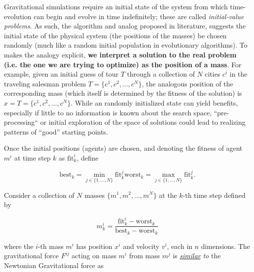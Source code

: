 \documentclass{article}
\begin{document}
            Gravitational simulations require an initial state of the system from which time-evolution can begin and evolve in time indefinitely; these are called \emph{initial-value problems}.  As such, the algorithm and analog proposed in literature\cite{GSA}, suggests the initial state of the physical system (the positions of the masses) be chosen randomly (much like a random initial population in evolutionary algorithms).  To makes the analogy explicit, \textbf{we interpret a solution to the real problem (i.e. the one we are trying to optimize) as the position of a mass}.  For example, given an initial guess of tour $T$ through a collection of $N$ cities $c^i$ in the traveling salesman problem $T = \{c^1, c^2, \ldots, c^N\}$, the analogous position of the corresponding mass (which itself is determined by the fitness of the solution) is $x = T = \{c^1, c^2, \ldots, c^N\}$.  While an randomly initialized state can yield benefits, especially if little to no information is known about the search space, ``pre-processing`` or initial exploration of the space of solutions could lead to realizing patterns of ``good'' starting points.

            Once the initial positions (agents) are chosen, and denoting the fitness of agent $m^i$ at time step $k$ as $\mathrm{fit}_k^i$, define

            \begin{subequations}
                \begin{equation}
                    \mathrm{best}_k = \min_{j \in \{1, \ldots, N\}} \mathrm{fit}_k^j
                \end{equation}
                \begin{equation}
                    \mathrm{worst}_k = \max_{j \in \{1, \ldots, N\}} \mathrm{fit}_k^j.
                \end{equation}
            \end{subequations}

            Consider a collection of $N$ masses $\{m^1, m^2, \ldots, m^N\}$ at the $k$-th time step defined by 
            
            \begin{equation}
                m_k^i = \frac{\mathrm{fit}_k^i - \mathrm{worst}_k}{\mathrm{best}_k- \mathrm{worst}_k}
            \end{equation}
            
            where the $i$-th mass $m^i$ has position $x^i$ and velocity $v^i$, each in $n$ dimensions.  The gravitational force $F^{ij}$ acting on mass $m^i$ from mass $m^j$ is \emph{\underline{similar} to} the Newtonian Gravitational force as 
\end{document}
